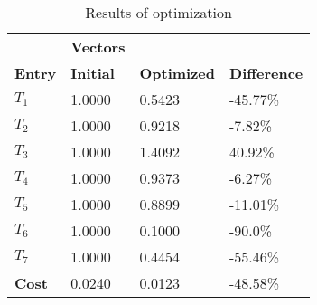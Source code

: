 \begin{table}[H]
\centering
\begin{tabular}{llll}
\textbf{}      & \cellcolor[HTML]{EFEFEF}\textbf{Vectors} & \textbf{} & \textbf{}         \\
\rowcolor[HTML]{EFEFEF} 
\textbf{Entry} & \textbf{Initial} & \textbf{Optimized} & \textbf{Difference} \\
$T_1$ & 1.0000 & 0.5423 & -45.77\% \\ 
$T_2$ & 1.0000 & 0.9218 & -7.82\% \\ 
$T_3$ & 1.0000 & 1.4092 & 40.92\% \\ 
$T_4$ & 1.0000 & 0.9373 & -6.27\% \\ 
$T_5$ & 1.0000 & 0.8899 & -11.01\% \\ 
$T_6$ & 1.0000 & 0.1000 & -90.0\% \\ 
$T_7$ & 1.0000 & 0.4454 & -55.46\% \\ 
\rowcolor[HTML]{EFEFEF} 
\textbf{Cost}  & 0.0240 & 0.0123 & -48.58\% \\ 
\end{tabular}
\caption{Results of optimization}
\label{tab:OptimizationAnalysis}
\end{table}